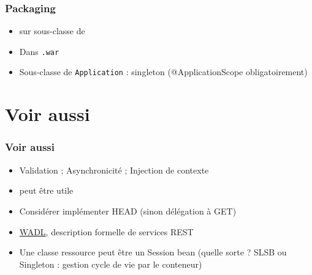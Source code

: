 \documentclass[english, french]{beamer}
\begin{document}
\begin{frame}
	\frametitle{Packaging}
	\begin{itemize}
		\item {} sur sous-classe de 
		\item Dans \texttt{.war}
		\item Sous-classe de \texttt{Application} : singleton {\tiny (@ApplicationScope obligatoirement)}
	\end{itemize}
\end{frame}

\section{Voir aussi}
\begin{frame}
	\frametitle{Voir aussi}
	\begin{itemize}
		\item Validation ; Asynchronicité ; Injection de contexte%
		\item {} peut être utile
		\item Considérer implémenter HEAD (sinon délégation à GET)
		\item \href{http://www.w3.org/Submission/wadl/}{WADL}, description formelle de services REST
		\item Une classe ressource peut être un Session bean (quelle sorte ? \pause SLSB ou Singleton : gestion cycle de vie par le conteneur)
	\end{itemize}
\end{frame}
\end{document}
